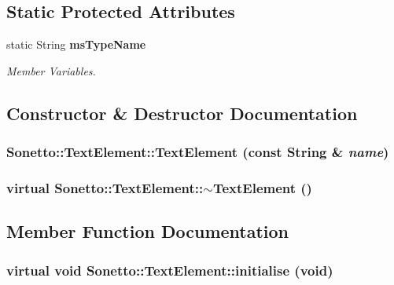 \subsection*{Static Protected Attributes}
\begin{CompactItemize}
\item 
static String {\bf msTypeName}
\begin{CompactList}\small\item\em Member Variables. \item\end{CompactList}\end{CompactItemize}


\subsection{Constructor \& Destructor Documentation}
\subsubsection{\setlength{\rightskip}{0pt plus 5cm}Sonetto::TextElement::TextElement (const String \& {\em name})}\label{class_sonetto_1_1_text_element_53c4a2c30fe321720dcc0e635a6a0168}


\subsubsection{\setlength{\rightskip}{0pt plus 5cm}virtual Sonetto::TextElement::$\sim$TextElement ()\hspace{0.3cm}{\tt  [virtual]}}\label{class_sonetto_1_1_text_element_cff2754a2b719ad6aaa9c9560458c671}




\subsection{Member Function Documentation}
\subsubsection{\setlength{\rightskip}{0pt plus 5cm}virtual void Sonetto::TextElement::initialise (void)\hspace{0.3cm}{\tt  [virtual]}}\label{class_sonetto_1_1_text_element_2037a3e1c6e85d62fccd7537561e76f2}


